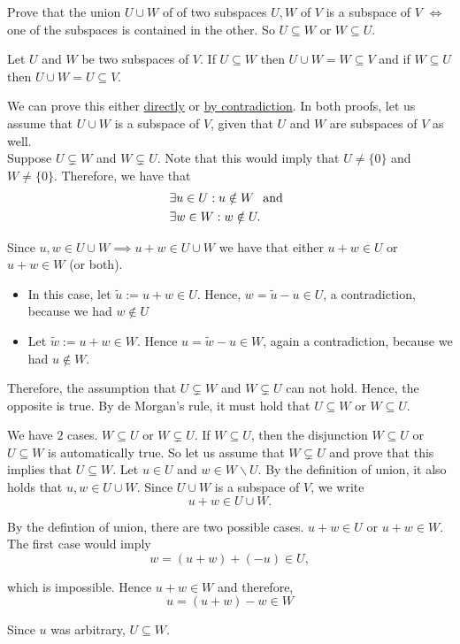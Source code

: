 \setcounter{xrcscount}{11}
\begin{xrcs}
  Prove that the union $U \cup W$ of of two subspaces $U, W$ of $V$ is a subspace of $V$ $\iff$ one of the subspaces is contained in the other. So $U\subseteq W$ or $W \subseteq U$.

  \begin{xprf}
    \Leftarrowdirection Let $U$ and $W$ be two subspaces of $V$. If $U \subseteq W$ then $U \cup W = W \subseteq V$ and if $W \subseteq U$ then $U \cup W = U \subseteq V$.

    \Rightarrowdirection We can prove this either \underline{directly} or \underline{by contradiction}. In both proofs, let us assume that $U \cup W$ is a subspace of $V$, given that $U$ and $W$ are subspaces of $V$ as well. \\
     Suppose $U \subsetneq W$ and $W \subsetneq U$. Note that this would imply that $U \neq \{0\}$ and $W \neq \{0\}$. Therefore, we have that
    \[
    \begin{aligned}
      &\exists u \in U: u \notin W \;\;\, \text{and}\;\; \\
      &\exists w \in W: w \notin U.
    \end{aligned}
    \]

    Since $u,w \in U \cup W \implies u+w \in U \cup W $ we have that either $u+w \in U$ or $u+w \in W$ (or both).

    \begin{itemize}
      \item {} In this case, let $\widetilde{u} := u + w \in U$. Hence, $w = \widetilde{u} - u \in U$, a contradiction, because we had $w \notin U$
      \item {} Let $\widetilde w := u + w \in W$. Hence $u = \widetilde{w} - u \in W$, again a contradiction, because we had $u \notin W$.
    \end{itemize}

    Therefore, the assumption that $U \subsetneq W$ and $W \subsetneq U$ can not hold. Hence, the opposite is true. By de Morgan's rule, it must hold that $U \subseteq W$ or $W \subseteq U$.

     We have $2$ cases. $W \subseteq U$ or $W \subsetneq U$. If $W \subseteq U$, then the disjunction
    $
    W \subseteq U $ or $ U \subseteq W
    $
    is automatically true. So let us assume that $W \subsetneq U$ and prove that this implies that $U \subseteq W$.
    Let $u \in U$ and $w \in W \backslash U$. By the definition of union, it also holds that $u,w \in U \cup W$. Since $U \cup W$ is a subspace of $V$, we write
    \[
    u+w \in U \cup W.
    \]

    By the defintion of union, there are two possible cases. $u+w \in U$ or $u+w \in W$. The first case would imply
    \[
    w = (u+w) + (-u) \in U,
    \]

    which is impossible. Hence $u+w \in W$ and therefore,
    \[
    u= (u+w) -w \in W
    \]

    Since $u$ was arbitrary, $U \subseteq W$.
  \end{xprf}
\end{xrcs}
